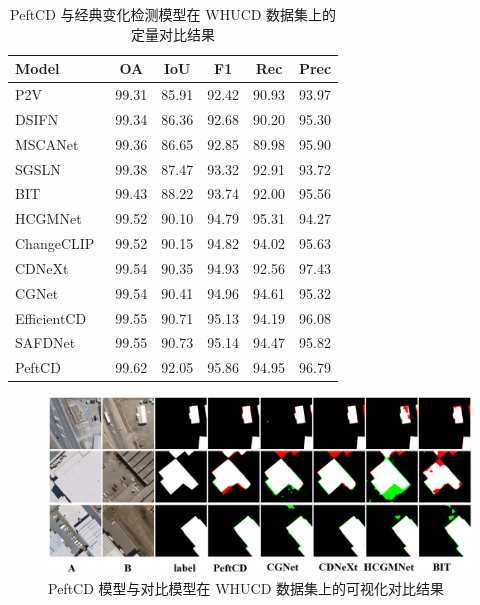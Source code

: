 \begin{table}[!htb]
\centering
\caption{PeftCD 与经典变化检测模型在 WHUCD 数据集上的定量对比结果}
\label{tab:peftcd_whucd}
\begin{tabular}{l c c c c c}
\toprule
\textbf{Model} & \textbf{OA} & \textbf{IoU} & \textbf{F1} & \textbf{Rec} & \textbf{Prec} \\
\midrule
P2V~\cite{lin_transition_2023} & 99.31 & 85.91 & 92.42 & 90.93 & 93.97 \\
DSIFN~\cite{Zhang2020ADS} & 99.34 & 86.36 & 92.68 & 90.20 & 95.30 \\
MSCANet~\cite{m_liu_cnn-transformer_2022} & 99.36 & 86.65 & 92.85 & 89.98 & 95.90 \\
SGSLN~\cite{zhao_exchanging_2023} & 99.38 & 87.47 & 93.32 & 92.91 & 93.72 \\
BIT~\cite{chen_remote_2022} & 99.43 & 88.22 & 93.74 & 92.00 & 95.56 \\
HCGMNet~\cite{Han2023HCGMNetAH} & 99.52 & 90.10 & 94.79 & 95.31 & 94.27 \\
ChangeCLIP~\cite{dong2024changeclip} & 99.52 & 90.15 & 94.82 & 94.02 & 95.63 \\
CDNeXt~\cite{wei_robust_2024} & 99.54 & 90.35 & 94.93 & 92.56 & 97.43 \\
CGNet~\cite{han_change_2023} & 99.54 & 90.41 & 94.96 & 94.61 & 95.32 \\
EfficientCD~\cite{dong_efficientcd_2024} & 99.55 & 90.71 & 95.13 & 94.19 & 96.08 \\
SAFDNet~\cite{Fu2025BeyondCD} & 99.55 & 90.73 & 95.14 & 94.47 & 95.82 \\
\midrule
PeftCD & 99.62 & 92.05 & 95.86 & 94.95 & 96.79 \\
\bottomrule
\end{tabular}
\end{table}

\begin{figure}[!htb]
  \centering
  \includegraphics[width=\textwidth]{paper_figures/基于AI基础模型微调的变化检测模型研究/PeftCD/peftcd_whucd.png}
  \caption{PeftCD 模型与对比模型在 WHUCD 数据集上的可视化对比结果}
  \label{fig:peftcd_whucd}
\end{figure}



